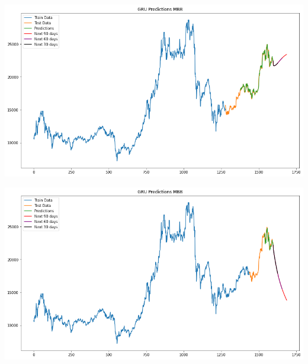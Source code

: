 \documentclass[conference]{IEEEtran}
\begin{document}
\begin{minipage}{0.23\textwidth}
    \centering
    \includegraphics[width=\linewidth]{images/GRU/GRU_MBB_82.png}
    \label{fig:image1}
\end{minipage}
\hfill
\begin{minipage}{0.23\textwidth}
    \centering
    \includegraphics[width=\linewidth]{images/GRU/GRU_MBB_91.png}
    \label{fig:image2}
\end{minipage}
\end{document}
